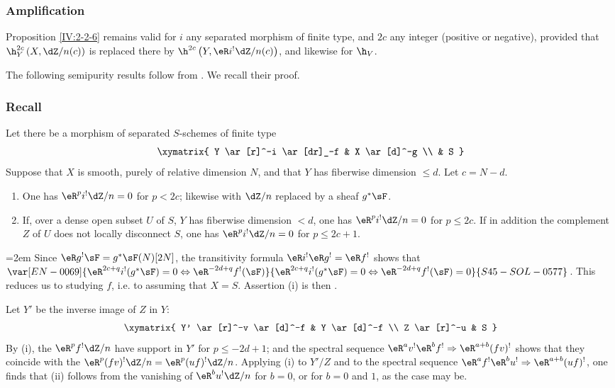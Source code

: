 \subsubsection{Amplification}\label{IV:2-2-7}

Proposition \ref{IV:2-2-6} remains valid for $i$ any separated morphism of
finite type, and $2 c$ any integer (positive or negative), provided that
$\h_Y^{2 c}\left(X,\dZ/n(c)\right)$ is replaced there by
$\h^{2 c}\left(Y,\eR i^!\dZ/n(c)\right)$, and likewise for $\h_V$.

The following semipurity results follow from .
We recall their proof.






\subsubsection{Recall}\label{IV:2-2-8}
Let there be a morphism of separated $S$-schemes of finite type
\[\xymatrix{
  Y \ar[r]^-i \ar[dr]_-f
    & X \ar[d]^-g \\
  & S
}\]
Suppose that $X$ is smooth, purely of relative dimension $N$, and that $Y$
has fiberwise dimension $\leqslant d$. Let $c=N-d$.
\begin{enumerate}[\indent (i)]
  \item One has $\eR^p i^!\dZ/n=0$ for $p<2 c$; likewise with $\dZ/n$
    replaced by a sheaf $g^* \sF$.
  \item If, over a dense open subset $U$ of $S$, $Y$ has fiberwise dimension
    $<d$, one has $\eR^p i^!\dZ/n=0$ for $p\leqslant 2 c$. If in addition
    the complement $Z$ of $U$ does not locally disconnect $S$, one has
    $\eR^pi^!\dZ/n=0$ for $p\leqslant 2 c+1$.
\end{enumerate}
\begingroup
\emergencystretch=2em\relax
Since $\eR g^! \sF=g^*\sF(N)[2N]$, the transitivity formula
$\eR i^!\eR g^!=\eR f^!$ shows that
$\var[EN-0069]{\eR^{2 c+q} i^!(g^*\sF)=0\Leftrightarrow \eR^{-2 d+q}f^!(\sF)}{\eR^{2 c+q} i^!(g^*\sF)=0\Leftrightarrow \eR^{-2 d+q}f^!(\sF)=0}{S45-SOL-0577}$. This reduces
us to studying $f$, i.e. to assuming that $X=S$. Assertion (i) is then
.\par
\endgroup

Let $Y'$ be the inverse image of $Z$ in $Y$:
\[\xymatrix{
  Y' \ar[r]^-v \ar[d]^-f
    & Y \ar[d]^-f \\
  Z \ar[r]^-u
    & S
}\]
By (i), the $\eR^p f^! \dZ/n$ have support in $Y'$ for
$p\leqslant -2 d+1$; and the spectral sequence
$\eR^a v^!\eR^b f^! \Rightarrow \eR^{a+b} (f v)^!$ shows that they coincide
with the $\eR^p(f v)^!\dZ/n=\eR^p(u f)^!\dZ/n$. Applying (i) to $Y'/Z$ and
to the spectral sequence
$\eR^a f^!\eR^b u^! \Rightarrow \eR^{a+b} (u f)^!$, one finds that (ii)
follows from the vanishing of $\eR^b u^! \dZ/n$ for $b=0$, or for $b=0$ and
$1$, as the case may be.






